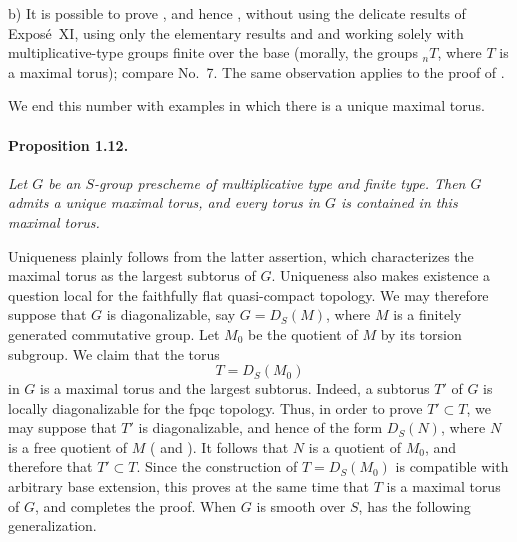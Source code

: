b) It is possible to prove , and hence , without using the
delicate results of Exposé~XI, using only the elementary results
 and  and working solely with multiplicative-type groups
finite over the base (morally, the groups \({}_nT\), where \(T\) is a
maximal torus); compare No.~7. The same observation applies to the
proof of .

We end this number with examples in which there is a unique maximal
torus.

\paragraph{\textbf{Proposition 1.12.}}
\emph{Let \(G\) be an \(S\)-group prescheme of multiplicative type
and finite type. Then \(G\) admits a unique maximal torus, and every
torus in \(G\) is contained in this maximal torus.}

Uniqueness plainly follows from the latter assertion, which
characterizes the maximal torus as the largest subtorus of \(G\).
Uniqueness also makes existence a question local for the faithfully
flat quasi-compact topology. We may therefore suppose that \(G\) is
diagonalizable, say \(G=D_S(M)\), where \(M\) is a finitely generated
commutative group. Let \(M_0\) be the quotient of \(M\) by its torsion
subgroup. We claim that the torus
\[
  T=D_S(M_0)
\]
in \(G\) is a maximal torus and the largest subtorus. Indeed, a
subtorus \(T'\) of \(G\) is locally diagonalizable for the fpqc
topology. Thus, in order to prove \(T'\subset T\), we may suppose that
\(T'\) is diagonalizable, and hence of the form \(D_S(N)\), where
\(N\) is a free quotient of \(M\) ( and ). It follows
that \(N\) is a quotient of \(M_0\), and therefore that
\(T'\subset T\). Since the construction of \(T=D_S(M_0)\) is
compatible with arbitrary base extension, this proves at the same
time that \(T\) is a maximal torus of \(G\), and completes the proof.
When \(G\) is smooth over \(S\),  has the following
generalization.

